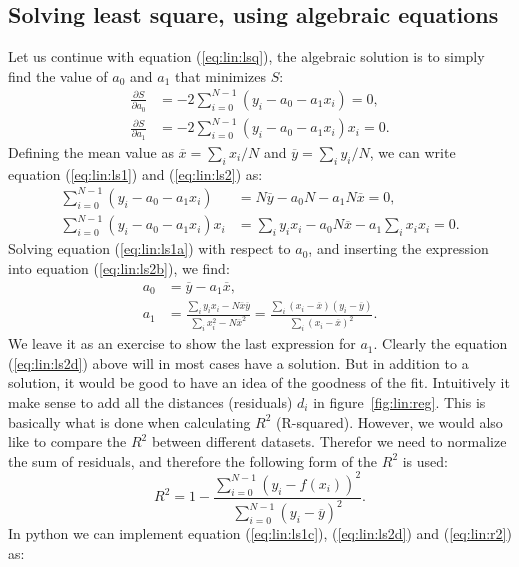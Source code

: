 \documentclass[graybox,sectrefs,envcountresetchap,open=right,final]{svmonodo}
\begin{document}
\subsection{Solving least square, using algebraic equations}
Let us continue with equation (\ref{eq:lin:lsq}), the algebraic solution is to simply find the value of $a_0$ and $a_1$ that minimizes $S$:
\begin{align}
\frac{\partial S}{\partial a_0} &=-2\sum_{i=0}^{N-1}(y_i-a_0-a_1x_i)=0,
\label{eq:lin:ls1} \\ 
\frac{\partial S}{\partial a_1} &=-2\sum_{i=0}^{N-1}(y_i-a_0-a_1x_i)x_i=0.
\label{eq:lin:ls2}
\end{align}
Defining the mean value as $\overline{x}=\sum_ix_i/N$ and $\overline{y}=\sum_iy_i/N$, we can write equation (\ref{eq:lin:ls1}) and (\ref{eq:lin:ls2})  as:
\begin{align}
\sum_{i=0}^{N-1}(y_i-a_0-a_1x_i)&=N\overline{y}-a_0N-a_1N\overline{x}=0,
\label{eq:lin:ls1a} \\ 
\sum_{i=0}^{N-1}(y_i-a_0-a_1x_i)x_i&=\sum_iy_ix_i-a_0N\overline{x}-a_1\sum_ix_ix_i=0.
\label{eq:lin:ls2b}
\end{align}
Solving equation (\ref{eq:lin:ls1a}) with respect to $a_0$, and inserting the expression into equation (\ref{eq:lin:ls2b}), we find:
\begin{align}
a_0&=\overline{y}-a_1\overline{x},\label{eq:lin:ls1c} \\ 
a_1&=\frac{\sum_iy_ix_i-N\overline{x}\overline{y}}{\sum_ix_i^2-N\overline{x}^2}
=\frac{\sum_i(x_i-\overline{x})(y_i-\overline{y})}{\sum_i(x_i-\overline{x})^2}.
\label{eq:lin:ls2d}
\end{align}
We leave it as an exercise to show the last expression for $a_1$.  
Clearly the equation (\ref{eq:lin:ls2d}) above will in most cases have
a solution. But in addition to a solution, it would be good to have an
idea of the goodness of the fit. Intuitively it make sense to add all
the distances (residuals) $d_i$ in figure~\ref{fig:lin:reg}. This is
basically what is done when calculating $R^2$ (R-squared). However, we
would also like to compare the $R^2$ between different
datasets. Therefor we need to normalize the sum of residuals, and
therefore the following form of the $R^2$ is used:
\begin{equation}
R^2=1-\frac{\sum_{i=0}^{N-1}(y_i-f(x_i))^2}{\sum_{i=0}^{N-1}(y_i-\overline{y})^2}.
\label{eq:lin:r2}
\end{equation}
In python we can implement equation (\ref{eq:lin:ls1c}), (\ref{eq:lin:ls2d}) and (\ref{eq:lin:r2}) as:
\end{document}
